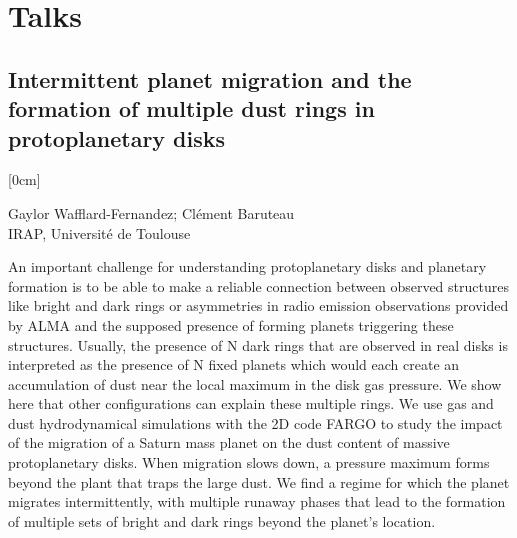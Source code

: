\documentclass[a4paper,11pt]{book}
\begin{document}
\mainmatter


\chapter*{Talks}
        
          \section[Intermittent planet migration and the formation of multiple dust rings in protoplanetary disks \newline(Gaylor Wafflard-Fernandez)] { Intermittent planet migration and the formation of multiple dust rings in protoplanetary disks }



[0cm]



\begin{center}
    
{\large Gaylor Wafflard-Fernandez};{ \large  Clément Baruteau}\\
  
\vspace{2 mm}
\noindent IRAP, Université de Toulouse\\

\end{center}



  
\vspace{2 mm}
\noindent An important challenge for understanding protoplanetary disks and planetary formation is to be able to make a reliable connection between observed structures like bright and dark rings or asymmetries in radio emission observations provided by ALMA and the supposed presence of forming planets triggering these structures. Usually, the presence of N dark rings that are observed in real disks is interpreted as the presence of N fixed planets which would each create an accumulation of dust near the local maximum in the disk gas pressure. We show here that other configurations can explain these multiple rings. We use gas and dust hydrodynamical simulations with the 2D code FARGO to study the impact of the migration of a Saturn mass planet on the dust content of massive protoplanetary disks. When migration slows down, a pressure maximum forms beyond the plant that traps the large dust. We find a regime for which the planet migrates intermittently, with multiple runaway phases that lead to the formation of multiple sets of bright and dark rings beyond the planet’s location.
\end{document}
